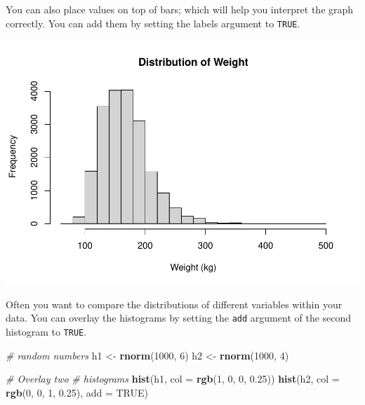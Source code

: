 \documentclass[
]{book}
\newenvironment{Shaded}{\begin{snugshade}}{\end{snugshade}}
\newcommand{\CommentTok}[1]{\textcolor[rgb]{0.56,0.35,0.01}{\textit{#1}}}
\newcommand{\DataTypeTok}[1]{\textcolor[rgb]{0.13,0.29,0.53}{#1}}
\newcommand{\DecValTok}[1]{\textcolor[rgb]{0.00,0.00,0.81}{#1}}
\newcommand{\FloatTok}[1]{\textcolor[rgb]{0.00,0.00,0.81}{#1}}
\newcommand{\KeywordTok}[1]{\textcolor[rgb]{0.13,0.29,0.53}{\textbf{#1}}}
\newcommand{\NormalTok}[1]{#1}
\newcommand{\OperatorTok}[1]{\textcolor[rgb]{0.81,0.36,0.00}{\textbf{#1}}}
\newcommand{\OtherTok}[1]{\textcolor[rgb]{0.56,0.35,0.01}{#1}}
\newcommand{\StringTok}[1]{\textcolor[rgb]{0.31,0.60,0.02}{#1}}
\begin{document}
You can also place values on top of bars; which will help you interpret the graph correctly. You can add them by setting the labels argument to \texttt{TRUE}.

\begin{Shaded}
\end{Shaded}

\includegraphics{_main_files/figure-latex/unnamed-chunk-172-1.pdf}

Often you want to compare the distributions of different variables within your data. You can overlay the histograms by setting the \texttt{add} argument of the second histogram to \texttt{TRUE}.

\begin{Shaded}
\begin{Highlighting}[]
\CommentTok{# random numbers}
\NormalTok{h1 <-}\StringTok{ }\KeywordTok{rnorm}\NormalTok{(}\DecValTok{1000}\NormalTok{, }\DecValTok{6}\NormalTok{)}
\NormalTok{h2 <-}\StringTok{ }\KeywordTok{rnorm}\NormalTok{(}\DecValTok{1000}\NormalTok{, }\DecValTok{4}\NormalTok{)}

\CommentTok{# Overlay two}
\CommentTok{# histograms}
\KeywordTok{hist}\NormalTok{(h1, }\DataTypeTok{col =} \KeywordTok{rgb}\NormalTok{(}\DecValTok{1}\NormalTok{,}
    \DecValTok{0}\NormalTok{, }\DecValTok{0}\NormalTok{, }\FloatTok{0.25}\NormalTok{))}
\KeywordTok{hist}\NormalTok{(h2, }\DataTypeTok{col =} \KeywordTok{rgb}\NormalTok{(}\DecValTok{0}\NormalTok{,}
    \DecValTok{0}\NormalTok{, }\DecValTok{1}\NormalTok{, }\FloatTok{0.25}\NormalTok{), }\DataTypeTok{add =} \OtherTok{TRUE}\NormalTok{)}
\end{Highlighting}
\end{Shaded}
\end{document}
